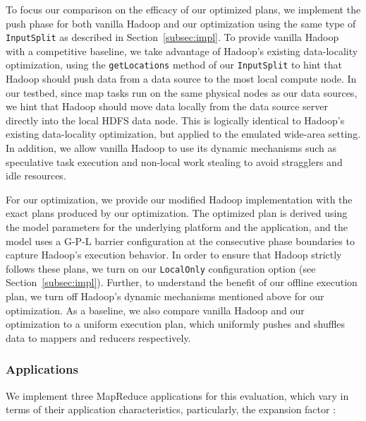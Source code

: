 To focus our comparison on the efficacy of our optimized plans, we implement
the push phase for both vanilla Hadoop and our optimization using the same type
of \verb=InputSplit= as described in Section~\ref{subsec:impl}.
To provide vanilla Hadoop with a competitive baseline, we take advantage of
Hadoop's existing data-locality optimization, using the \verb=getLocations=
method of our \verb=InputSplit= to hint that Hadoop should push data from a
data source to the most local compute node.
In our testbed, since map tasks run on the same physical nodes as our data
sources, we hint that Hadoop should move data locally from the data source
server directly into the local HDFS data node.
This is logically identical to Hadoop's existing data-locality optimization,
but applied to the emulated wide-area setting.
In addition, we allow vanilla Hadoop to use its dynamic mechanisms such as
speculative task execution and non-local work stealing to avoid stragglers and
idle resources.

For our optimization, we provide our modified Hadoop implementation with the
exact plans produced by our optimization.
The optimized plan is derived using the model parameters for the underlying
platform and the application, and the model uses a G-P-L barrier configuration
at the consecutive phase boundaries to capture Hadoop's execution behavior.
In order to ensure that Hadoop strictly follows these plans, we turn on our
\verb=LocalOnly= configuration option (see Section~\ref{subsec:impl}).
Further, to understand the benefit of our offline execution plan, we turn off
Hadoop's dynamic mechanisms mentioned above for our optimization.
As a baseline, we also compare vanilla Hadoop and our optimization to a uniform
execution plan, which uniformly pushes and shuffles data to mappers and
reducers respectively.

\subsubsection{Applications}

We implement three MapReduce applications for this evaluation, which vary in
terms of their application characteristics, particularly, the expansion factor
:

